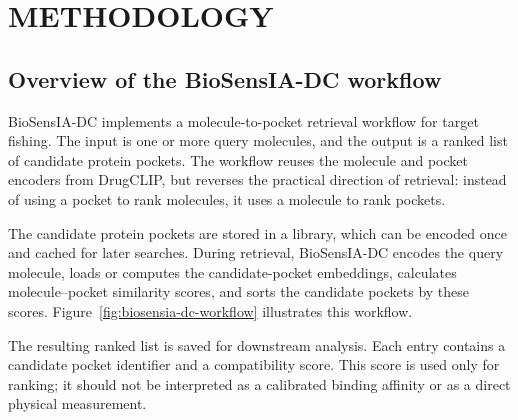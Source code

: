 \documentclass[12pt,fleqn]{article}
\begin{document}
\section{METHODOLOGY}

\subsection{Overview of the BioSensIA-DC workflow}

BioSensIA-DC implements a molecule-to-pocket retrieval workflow for
target fishing. The input is one or more query molecules, and the
output is a ranked list of candidate protein pockets. The workflow
reuses the molecule and pocket encoders from DrugCLIP, but reverses
the practical direction of retrieval: instead of using a pocket to
rank molecules, it uses a molecule to rank pockets.

The candidate protein pockets are stored in a library, which can be
encoded once and cached for later searches. During retrieval,
BioSensIA-DC encodes the query molecule, loads or computes the
candidate-pocket embeddings, calculates molecule--pocket similarity
scores, and sorts the candidate pockets by these scores.
Figure~\ref{fig:biosensia-dc-workflow} illustrates this workflow.

The resulting ranked list is saved for downstream analysis. Each entry
contains a candidate pocket identifier and a compatibility score. This
score is used only for ranking; it should not be interpreted as a
calibrated binding affinity or as a direct physical measurement.
\end{document}
